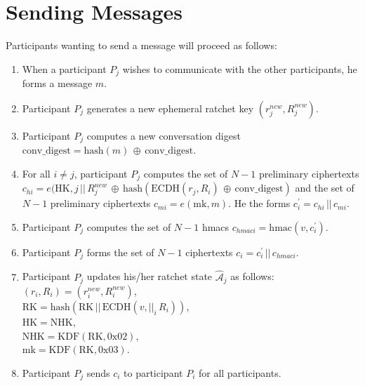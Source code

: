 \documentclass[%
preprint,
amsmath,amssymb,
aps,
prb,
floatfix,
]{revtex4-1}
\begin{document}
\section{\label{sec:sending}Sending Messages}
Participants wanting to send a message will proceed as follows:
\begin{enumerate}
\item When a participant $P_j$ wishes to communicate with the other
participants, he forms a message $m$.
\item Participant $P_j$ generates a new ephemeral ratchet key
$(r_j^{new},R_j^{new})$.
\item Participant $P_j$ computes a new conversation digest
$ \mathrm{conv\_digest} = \mathrm{hash}(m) \, \oplus \, \mathrm{conv\_digest}$.
\item For all $i \ne j$, participant $P_j$ computes the set of $N-1$ preliminary
ciphertexts $c_{hi} = e(\mathrm{HK}, j
\, || \, R_j^{new} \, \oplus \, \mathrm{hash}(\mathrm{ECDH}(r_j, R_i) \, \oplus
\, \mathrm{conv\_digest})$ and the
set of $N-1$ preliminary ciphertexts
$c_{mi} = e(\mathrm{mk}, m)$.
He the forms $c_i^\prime = c_{hi} \, || \, c_{mi}$.
\item Participant $P_j$ computes the set of $N-1$ hmacs $c_{hmaci} = \mathrm{hmac}(v, c_i^\prime)$.
\item Participant $P_j$ forms the set of $N-1$ ciphertexts $c_i = c_i^\prime \, || \, c_{hmaci}$.
\item Participant $P_j$ updates his/her ratchet state $\mathcal{\hat{A}}_j$ as
follows:\\
$(r_i, R_i) = (r_i^{new}, R_i^{new})$, \\
$\mathrm{RK} = \mathrm{hash}(\mathrm{RK} \, || \, \mathrm{ECDH}(v, ||_i
\, R_i))$, \\
$\mathrm{HK} = \mathrm{NHK}$, \\
$\mathrm{NHK} = \mathrm{KDF}(\mathrm{RK}, 0\mathrm{x}02)$, \\
$\mathrm{mk} = \mathrm{KDF}(\mathrm{RK}, 0\mathrm{x}03)$.
\item Participant $P_j$ sends $c_i $ to participant $P_i$ for all participants.
\end{enumerate}
\end{document}
